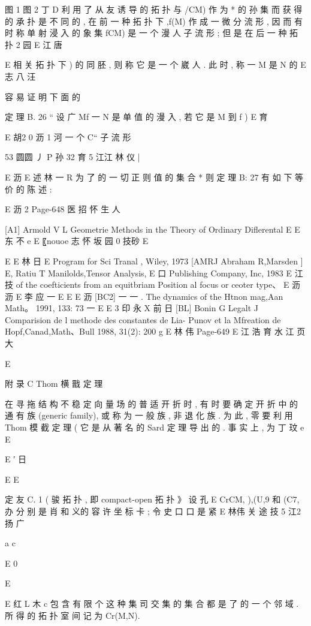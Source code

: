 图 1 图 2
丁 D 利 用 了 从 友 诱 导 的 拓 扑 与 /CM) 作 为 * 的 孙 集 而 获 得 的 承
扑 是 不 同 的 , 在 前 一 种 拓 扑 下 ,f(M) 作 成 一 微 分 流 形 , 因 而 有 时
称 单 射 浸 入 的 象 集 fCM) 是 一 个 漫 人 子 流 形 ; 但 是 在 后 一 种 拓 扑
2 园
E 江 唐

E
相 关 拓 扑 下 ) 的 同 胚 , 则 称 它 是 一 个 崴 人 . 此 时 , 称 一 M 是 N 的
E 志 八 汪

容 易 证 明 下 面 的

定 理 B. 26 “ 设 广 Mf 一 N 是 单 值 的 漫 入 , 若 它 是 M 到 f )
E 育

E 胡2
0 沥 1 河
一 个 C“ 子 流 形

53 圆圆 丿 P 孙 32 育 5 江江 林 仪 |

E 沥
E 述 林 一
R 为 了 的 一 切 正 则 值 的 集 合 * 则 定 理 B: 27 有 如 下 等 价 的 陈 述 :

E 沥 2
Page-648
医 招 怀 生 人

[A1] Armold V L Geometrie Methods in the Theory of Ordinary Diflerental
E
E 东 不 e
E
〖nouoe 志 怀 坂 园 0 技砂
E

E
E 林 日
E
Program for Sci Tranal , Wiley, 1973
[AMRJ Abraham R,Marsden ] E, Ratiu T Manilolds,Tensor Analysis,
E 口
Publishing Company, Inc, 1983
E 江 技
of the coefticients from an equitbriam Position al focus or ceoter type、
E 沥 沥 E 李 应 一
E
E
E 沥
[BC2] 一 一 . The dynamics of the Htnon mag,Aan Math。 1991, 133: 73 一
E
E
3 印 永 X 前 日
[BL] Bonin G Legalt J Comparision de l methode des constantes de Lia-
Punov et la Mfreation de Hopf,Canad,Math、Bull 1988, 31(2): 200
g
E 林 伟
Page-649
E 江 浩 育 水 江 页 大

E

附 录 C Thom 横 戬 定 理

在 寻 拖 结 构 不 稳 定 向 量 场 的 普 适 开 折 时 , 有 时 要 确 定 开 折 中
的 通 有 族 (generic family), 或 称 为 一 般 族 , 非 退 化 族 . 为 此 , 零 要 利
用 Thom 模 截 定 理 ( 它 是 从 著 名 的 Sard 定 理 导 出 的 . 事 实 上 , 为 丁
玟
e
E

E ′ 日

E
E

定 友 C. 1 ( 骏 拓 扑 , 即 compact-open 拓 扑 》 设 孔 E CrCM,
),(U,9 和 (C7, 办 分 别 是 肖 和 义的 容 许 坐 标 卡 ; 令 史 口 口 是 紧
E 林伟 关 途 技 5 江2 扬 广

a c

E 0

E

E 红 L 木 c
包 含 有 限 个 这 种 集 司 交 集 的 集 合 都 是 了 的 一 个 邻 域 . 所 得 的 拓 扑
室 间 记 为 Cr(M,N).

